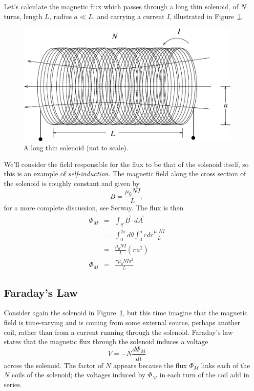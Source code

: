 Let's calculate the magnetic flux which passes through a long thin solenoid, 
of $N$ turns, length $L$, radius $a\ll L$, and carrying a current $I$, 
illustrated in Figure~\ref{fig:ind:solenoid}. 
\begin{figure}[htb]
\centering 
\epsfxsize=9cm \includegraphics[scale=0.6]{6_induction/solenoid.eps}
\caption{A long thin solenoid (not to scale).}
\label{fig:ind:solenoid}
\end{figure}
We'll consider the field responsible for the flux to be that of the solenoid 
itself, so this is an example of {\it self-induction}. The magnetic field 
along the cross section of the solenoid is roughly constant and given by
$$ B= \frac{\mu_0 N I}{L}; $$
for a more complete discussion, see Serway. The flux is then
\begin{eqnarray}
\Phi_M &=& \int_S \vec{B}\cdot d\vec{A} \nonumber \\
&=& \int_0^{2\pi} d\theta \int_0^a r dr \frac{\mu_0 NI}{L} \nonumber \\
&=& \frac{\mu_0 NI}{L} (\pi a^2) \nonumber \\
\Phi_M &=& \frac{\pi\mu_0N Ia^2}{L} \label{eq:ind:fluxgen}
\end{eqnarray}

\subsection{Faraday's Law}

Consider again the solenoid in Figure~\ref{fig:ind:solenoid}, but this time 
imagine that the magnetic field is time-varying and is coming from some
external source, perhaps another coil, rather than from a current running 
through the solenoid.  Faraday's law states that the magnetic flux through the 
solenoid induces a voltage
\begin{equation}
V=-N\frac{d\Phi_M}{dt} \label{eq:ind:faraday}
\end{equation}
across the solenoid.  The factor of $N$ appears because the flux $\Phi_M$ links
each of the $N$ coils of the solenoid; the voltages induced by $\Phi_M$ in 
each turn of the coil add in series. 


